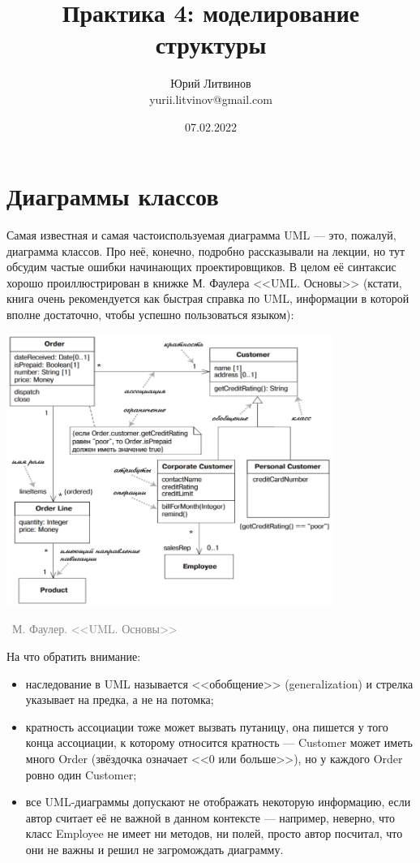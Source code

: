 \documentclass[a5paper]{article}
\title{Практика 4: моделирование структуры}
\author{Юрий Литвинов\\\small{yurii.litvinov@gmail.com}}
\date{07.02.2022}
\newcommand{\attribution}[1] {
    \vspace{-5mm}\begin{flushright}\begin{scriptsize}\textcolor{gray}{\textcopyright\, #1}\end{scriptsize}\end{flushright}
}
\begin{document}
\maketitle
\thispagestyle{empty}

\section{Диаграммы классов}

Самая известная и самая частоиспользуемая диаграмма UML --- это, пожалуй, диаграмма классов. Про неё, конечно, подробно рассказывали на лекции, но тут обсудим частые ошибки начинающих проектировщиков. В целом её синтаксис хорошо проиллюстрирован в книжке М. Фаулера <<UML. Основы>> (кстати, книга очень рекомендуется как быстрая справка по UML, информации в которой вполне достаточно, чтобы успешно пользоваться языком):

\begin{center}
    \includegraphics[width=0.8\textwidth]{umlClassDiagram.png}
    \attribution{М. Фаулер. <<UML. Основы>>}
\end{center}

На что обратить внимание:

\begin{itemize}
    \item наследование в UML называется <<обобщение>> (generalization) и стрелка указывает на предка, а не на потомка;
    \item кратность ассоциации тоже может вызвать путаницу, она пишется у того конца ассоциации, к которому относится кратность --- Customer может иметь много Order (звёздочка означает <<0 или больше>>), но у каждого Order ровно один Customer;
    \item все UML-диаграммы допускают не отображать некоторую информацию, если автор считает её не важной в данном контексте --- например, неверно, что класс Employee не имеет ни методов, ни полей, просто автор посчитал, что они не важны и решил не загромождать диаграмму.
\end{itemize}
\end{document}
